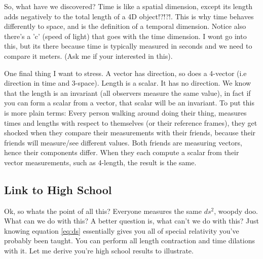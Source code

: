 So, what have we discovered? Time is like a spatial dimension, except its length adds negatively to the total length of a 4D object!?!?!. This is why time behaves differently to space, and is the definition of a temporal dimension. Notice also there's a 'c' (speed of light) that goes with the time dimension. I wont go into this, but its there because time is typically measured in seconds and we need to compare it meters. (Ask me if your interested in this). 

One final thing I want to stress. A vector has direction, so does a 4-vector (i.e direction in time and 3-space). Length is a scalar. It has no direction. We know that the length is an invariant (all observers measure the same value), in fact if you can form a scalar from a vector, that scalar will be an invariant. To put this is more plain terms: Every person walking around doing their thing, measures times and lengths with respect to themselves (or their reference frames), they get shocked when they compare their measurements with their friends, because their friends will measure/see different values. Both friends are measuring vectors, hence their components differ. When they each compute a scalar from their vector measurements, such as 4-length, the result is the same. 



\subsection{Link to High School}

Ok, so whats the point of all this? Everyone measures the same $ds^2$, woopdy doo. What can we do with this? A better question is, what can't we do with this? Just knowing equation \eqref{eq:ds} essentially gives you all of special relativity you've probably been taught. You can perform all length contraction and time dilations with it. Let me derive you're high school results to illustrate. 

